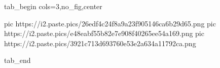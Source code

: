  
 
 
 
 


\ifcmt
  tab_begin cols=3,no_fig,center

     pic https://i2.paste.pics/26edf4c24f8a9a23f905146ca6b29d65.png
		 pic https://i2.paste.pics/e48eabf55b82e7e908f40265ee54a169.png
		 pic https://i2.paste.pics/3921c713d693760e53e2a634a11792ca.png

  tab_end
\fi
